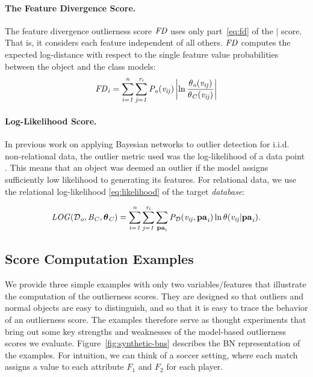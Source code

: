 {\paragraph{The Feature Divergence Score.}
The feature divergence outlierness score $\it{FD}$ uses only part~\eqref{eq:fd} of the $\mid$ score. That is, it considers each feature independent of all others.  $\it{FD}$ computes the expected log-distance with respect to  the single feature value probabilities between the object and the class models:
\begin{equation}
\it{FD}_{i}	=\sum_{i=1}^{n}\sum_{j=1}^{r_{i}} P_{o}( v_{ij}) \left|\ln \frac{\theta_{o}( v_{ij})}{\theta_{C}( v_{ij})}\right|
\end{equation}


\paragraph{Log-Likelihood Score.} 

In previous work on applying Bayesian networks to outlier detection for i.i.d. non-relational data, the outlier metric used was the log-likelihood of a data point \citep{Cansado2008}. This means that an object was deemed an outlier if the model assigns sufficiently low likelihood to generating its features. For relational data, we use the relational log-likelihood \eqref{eq:likelihood} of the target {\em database}:

\begin{equation} \label{eq:loglikelihood-score}
\it{LOG}(\mathcal{D}_{o},B_{C},\boldsymbol{\theta}_{C}) =   \sum_{i=1}^{n}\sum_{j=1}^{r_{i}} \sum_{\mathbf{pa}_{i}}P_{\mathcal{D}}(v_{ij},\mathbf{pa}_{i})\ln \theta(v_{ij}|\mathbf{pa}_{i}).
\end{equation}




\subsection{Score Computation Examples} \label{sec:divergence-examples} 
			
			
			We provide three simple examples with only two variables/features that illustrate the computation of the outlierness scores. They are designed so that outliers and normal objects are easy to distinguish, and so that it is easy to trace the behavior of an outlierness score.
			The examples therefore serve as thought experiments that bring out some key strengths and weaknesses of the model-based outlierness scores we evaluate. 
			Figure~\ref{fig:synthetic-bns} describes the BN representation of the examples. For intuition, we can think of a soccer setting, where each match assigns a value to each attribute $F_{1}$ and $F_{2}$ for each player. 
			
}
